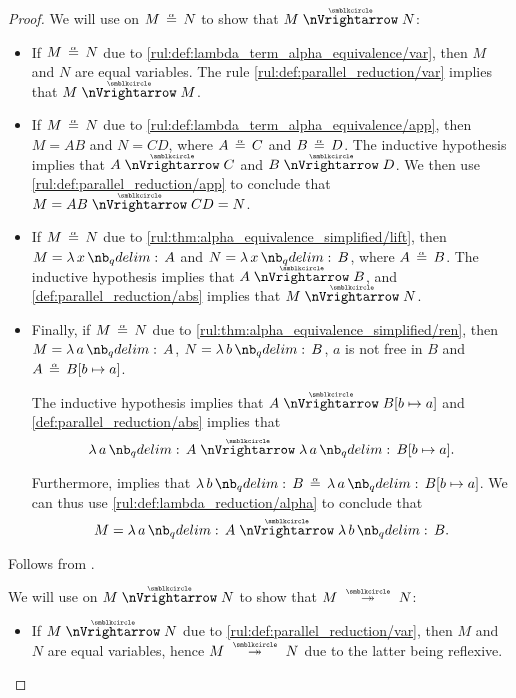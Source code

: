 \begin{proof}
   We will use  on \( M \aequiv N \) to show that \( M \ppred N \):
  \begin{itemize}
    \item If \( M \aequiv N \) due to \ref{rul:def:lambda_term_alpha_equivalence/var}, then \( M \) and \( N \) are equal variables. The rule \ref{rul:def:parallel_reduction/var} implies that \( M \ppred M \).

    \item If \( M \aequiv N \) due to \ref{rul:def:lambda_term_alpha_equivalence/app}, then \( M = AB \) and \( N = CD \), where \( A \aequiv C \) and \( B \aequiv D \). The inductive hypothesis implies that \( A \ppred C \) and \( B \ppred D \). We then use \ref{rul:def:parallel_reduction/app} to conclude that \( M = AB \ppred CD = N \).

    \item If \( M \aequiv N \) due to \ref{rul:thm:alpha_equivalence_simplified/lift}, then \( M = \qabs x A \) and \( N = \qabs x B \), where \( A \aequiv B \). The inductive hypothesis implies that \( A \ppred B \), and \ref{def:parallel_reduction/abs} implies that \( M \ppred N \).

    \item Finally, if \( M \aequiv N \) due to \ref{rul:thm:alpha_equivalence_simplified/ren}, then \( M = \qabs a A \), \( N = \qabs b B \), \( a \) is not free in \( B \) and \( A \aequiv B[b \mapsto a] \).

    The inductive hypothesis implies that \( A \ppred B[b \mapsto a] \) and \ref{def:parallel_reduction/abs} implies that
    \begin{equation*}
      \qabs a A \ppred \qabs a B[b \mapsto a].
    \end{equation*}

    Furthermore,  implies that \( \qabs b B \aequiv \qabs a B[b \mapsto a] \). We can thus use \ref{rul:def:lambda_reduction/alpha} to conclude that
    \begin{equation*}
      M = \qabs a A \ppred \qabs b B.
    \end{equation*}
  \end{itemize}

   Follows from .

   We will use  on \( M \ppred N \) to show that \( M \pred* N \):
  \begin{itemize}
    \item If \( M \ppred N \) due to \ref{rul:def:parallel_reduction/var}, then \( M \) and \( N \) are equal variables, hence \( M \pred* N \) due to the latter being reflexive.


\end{itemize}
\end{proof}
